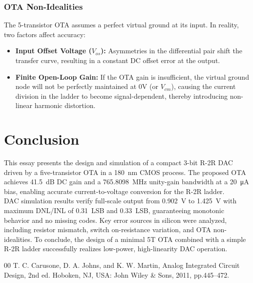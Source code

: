 \documentclass[conference]{IEEEtran}
\begin{document}
\subsubsection{OTA Non-Idealities}
The 5-transistor OTA assumes a perfect virtual ground at its input. In reality, two factors affect accuracy:
\begin{itemize}
    \item \textbf{Input Offset Voltage ($V_{os}$):} Asymmetries in the differential pair shift the transfer curve, resulting in a constant DC offset error at the output.
    \item \textbf{Finite Open-Loop Gain:} If the OTA gain is insufficient, the virtual ground node will not be perfectly maintained at 0V (or $V_{cm}$), causing the current division in the ladder to become signal-dependent, thereby introducing non-linear harmonic distortion.
\end{itemize}

\section{Conclusion}
This essay presents the design and simulation of a compact 3-bit R-2R DAC driven by a five-transistor OTA in a \SI{180}{\nano\meter} CMOS process. 
The proposed OTA achieves \SI{41.5}{\deci\bel} DC gain and a \SI{765.8098}{\mega\hertz} unity-gain bandwidth at a \SI{20}{\micro\ampere} bias, enabling accurate current-to-voltage conversion for the R-2R ladder. \\
DAC simulation results verify full-scale output from \SI{0.902}{\volt} to \SI{1.425}{\volt} with maximum DNL/INL of \SI{0.31}{LSB} and \SI{0.33}{LSB}, guaranteeing monotonic behavior and no missing codes. 
Key error sources in silicon were analyzed, including resistor mismatch, switch on-resistance variation, and OTA non-idealities.
To conclude, the design of a minimal 5T OTA combined with a simple R-2R ladder successfully realizes low-power, high-linearity DAC operation.


\begin{thebibliography}{00}
 T. C. Carusone, D. A. Johns, and K. W. Martin, Analog Integrated Circuit Design, 2nd ed. Hoboken, NJ, USA: John Wiley \& Sons, 2011, pp.445--472.
\end{thebibliography}
\end{document}
